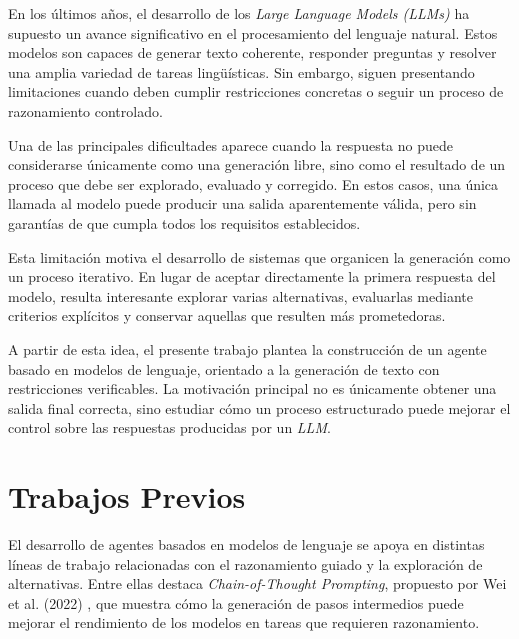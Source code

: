 \documentclass[12pt,a4paper,twoside,openright]{book}
\begin{document}

En los últimos años, el desarrollo de los \emph{Large Language Models (LLMs)} ha supuesto un avance significativo en el procesamiento del lenguaje natural. Estos modelos son capaces de generar texto coherente, responder
preguntas y resolver una amplia variedad de tareas lingüísticas. Sin embargo, siguen presentando limitaciones cuando deben cumplir restricciones concretas o seguir un proceso de razonamiento controlado.

Una de las principales dificultades aparece cuando la respuesta no puede considerarse únicamente como una generación libre, sino como el resultado de un proceso que debe ser explorado, evaluado y corregido.
En estos casos, una única llamada al modelo puede producir una salida aparentemente válida, pero sin garantías de que cumpla todos los requisitos establecidos.

Esta limitación motiva el desarrollo de sistemas que organicen la generación como un proceso iterativo.
En lugar de aceptar directamente la primera respuesta del modelo, resulta interesante explorar varias alternativas, evaluarlas mediante criterios explícitos y conservar aquellas que resulten más prometedoras.

A partir de esta idea, el presente trabajo plantea la construcción de un agente basado en modelos de lenguaje, orientado a la generación de texto con restricciones verificables.
La motivación principal no es únicamente obtener una salida final correcta, sino estudiar cómo un proceso estructurado puede mejorar el control sobre las respuestas producidas por un \emph{LLM}.



\section{Trabajos Previos}

El desarrollo de agentes basados en modelos de lenguaje se apoya en distintas líneas de trabajo relacionadas con el razonamiento guiado y la exploración de alternativas.
Entre ellas destaca \emph{Chain-of-Thought Prompting}, propuesto por Wei et al. (2022) \cite{wei2022chain}, que muestra cómo la generación de pasos intermedios puede mejorar el rendimiento de los modelos en tareas que requieren razonamiento.
\end{document}
